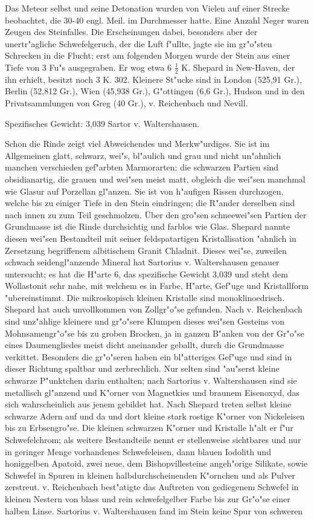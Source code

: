 \documentclass[a4paper, 11pt, oneside]{article}
\begin{document}
Das Meteor selbst und seine Detonation wurden von Vielen auf einer Strecke beobachtet, die 30-40 engl. Meil. im Durchmesser hatte. Eine Anzahl Neger waren Zeugen des Steinfalles. Die Erscheinungen dabei, besonders aber der unertr"agliche Schwefelgeruch, der die Luft f"ullte, jagte sie im gr"o"sten Schrecken in die Flucht; erst am folgenden Morgen wurde der Stein aus einer Tiefe von 3 Fu"s ausgegraben. Er wog etwa 6 $\frac{1}{2}$ K. Shepard in New-Haven, der ihn erhielt, besitzt noch 3 K. 302. Kleinere St"ucke sind in London (525,91 Gr.), Berlin (52,812 Gr.), Wien (45,938 Gr.), G"ottingen (6,6 Gr.), Hudson und in den Privatsammlungen von Greg (40 Gr.), v. Reichenbach und Nevill.

Spezifisches Gewicht: 3,039 Sartor v. Waltershausen.

Schon die Rinde zeigt viel Abweichendes und Merkw"urdiges. Sie ist im Allgemeinen glatt, schwarz, wei"s, bl"aulich und grau und nicht un"ahnlich manchen verschieden gef"arbten Marmorarten; die schwarzen Partien sind obsidianartig, die grauen und wei"sen meist matt, obgleich die wei"sen manchmal wie Glasur auf Porzellan gl"anzen. Sie ist von h"aufigen Rissen durchzogen, welche bis zu einiger Tiefe in den Stein eindringen; die R"ander derselben sind nach innen zu zum Teil geschmolzen. Über den gro"sen schneewei"sen Partien der Grundmasse ist die Rinde durchsichtig und farblos wie Glas. Shepard nannte diesen wei"sen Bestandteil mit seiner feldspatartigen Kristallisation "ahnlich in Zersetzung begriffenem albitischem Granit Chladnit. Dieses wei"se, zuweilen schwach seidengl"anzende Mineral hat Sartorius v. Waltershausen genauer untersucht; es hat die H"arte 6, das spezifische Gewicht 3,039 und steht dem Wollastonit sehr nahe, mit welchem es in Farbe, H"arte, Gef"uge und Kristallform "ubereinstimmt. Die mikroskopisch kleinen Kristalle sind monoklinoedrisch. Shepard hat auch unvollkommen von Zollgr"o"se gefunden. Nach v. Reichenbach sind unz"ahlige kleinere und gr"o"sere Klumpen dieses wei"sen Gesteins von Mohnsamengr"o"se bis zu groben Brocken, ja in ganzen B"anken von der Gr"o"se eines Daumengliedes meist dicht aneinander geballt, durch die Grundmasse verkittet. Besonders die gr"o"seren haben ein bl"atteriges Gef"uge und sind in dieser Richtung spaltbar und zerbrechlich. Nur selten sind "au"serst kleine schwarze P"unktchen darin enthalten; nach Sartorius v. Waltershausen sind sie metallisch gl"anzend und K"orner von Magnetkies und braunem Eisenoxyd, das sich wahrscheinlich aus jenem gebildet hat. Nach Shepard treten selbst kleine schwarze Adern auf und da und dort kleine stark rostige K"orner von Nickeleisen bis zu Erbsengro"se. Die kleinen schwarzen K"orner und Kristalle h"alt er f"ur Schwefelchrom; als weitere Bestandteile nennt er stellenweise sichtbares und nur in geringer Menge vorhandenes Schwefeleisen, dann blauen Iodolith und honiggelben Apatoid, zwei neue, dem Bishopvillesteine angeh"orige Silikate, sowie Schwefel in Spuren in kleinen halbdurchscheinenden K"ornchen und als Pulver zerstreut. v. Reichenbach best"atigte das Auftreten von gediegenem Schwefel in kleinen Nestern von blass und rein schwefelgelber Farbe bis zur Gr"o"se einer halben Linse. Sartorius v. Waltershausen fand im Stein keine Spur von schweren 
\end{document}
